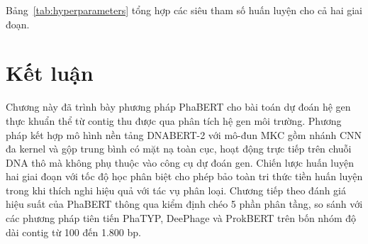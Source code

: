 
Bảng~\ref{tab:hyperparameters} tổng hợp các siêu tham số huấn luyện cho cả hai giai đoạn.

\begin{table}[h]
    \centering
    \caption{Tổng hợp siêu tham số huấn luyện}
    \label{tab:hyperparameters}
\end{table}

\section{Kết luận}

Chương này đã trình bày phương pháp PhaBERT cho bài toán dự đoán hệ gen thực khuẩn thể từ contig thu được qua phân tích hệ gen môi trường. Phương pháp kết hợp mô hình nền tảng DNABERT-2 với mô-đun MKC gồm nhánh CNN đa kernel và gộp trung bình có mặt nạ toàn cục, hoạt động trực tiếp trên chuỗi DNA thô mà không phụ thuộc vào công cụ dự đoán gen. Chiến lược huấn luyện hai giai đoạn với tốc độ học phân biệt cho phép bảo toàn tri thức tiền huấn luyện trong khi thích nghi hiệu quả với tác vụ phân loại. Chương tiếp theo đánh giá hiệu suất của PhaBERT thông qua kiểm định chéo 5 phần phân tầng, so sánh với các phương pháp tiên tiến PhaTYP, DeePhage và ProkBERT trên bốn nhóm độ dài contig từ 100 đến 1.800 bp.